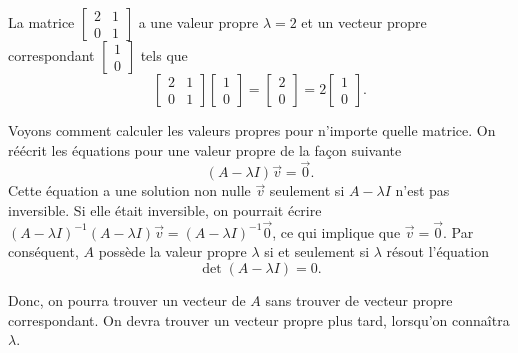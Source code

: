 \begin{example}
La matrice $\left[ \begin{smallmatrix}
					2 & 1 \\
					0 & 1
					\end{smallmatrix} \right]$ 
a une valeur propre $\lambda = 2$ et un vecteur propre correspondant 
$\left[ \begin{smallmatrix}
	1 \\ 0
\end{smallmatrix} \right]$ 
tels que
\begin{equation*}
\begin{bmatrix}
2 & 1 \\
0 & 1
\end{bmatrix}
\begin{bmatrix}
1 \\ 0
\end{bmatrix}
=
\begin{bmatrix}
2 \\
0 
\end{bmatrix}
=
2
\begin{bmatrix}
1 \\ 0
\end{bmatrix} .
\end{equation*}
\end{example}

Voyons comment calculer les valeurs propres pour n’importe quelle matrice. On réécrit les équations pour une valeur propre de la façon suivante
\begin{equation*}
(A - \lambda I)\vec{v} = \vec{0} .
\end{equation*}
Cette équation a une solution non nulle $\vec{v}$ seulement si 
$A - \lambda I$ n’est pas inversible. Si elle était inversible, on pourrait écrire
${(A - \lambda I)}^{-1}(A - \lambda I)\vec{v} = {(A-\lambda I)}^{-1}\vec{0}$,
ce qui implique que $\vec{v} = \vec{0}$.  Par conséquent,
$A$ possède la valeur propre $\lambda$ si et seulement si $\lambda$ résout l'équation
\begin{equation*}
\det (A-\lambda I) = 0 .
\end{equation*}

Donc, on pourra trouver un vecteur de $A$ sans trouver de vecteur propre correspondant. On devra trouver un vecteur propre plus tard, lorsqu’on connaîtra $\lambda$.

